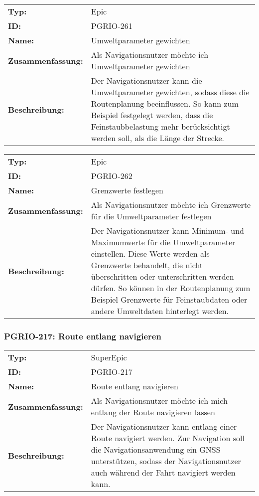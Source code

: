 		\begin{flushleft} 
\begin{tabular}{@{}lp{100mm}} 
\textbf{Typ:} & Epic \\ 
\textbf{ID:} & PGRIO-261 \\ 
\textbf{Name:} & Umweltparameter gewichten \\ 
\textbf{Zusammenfassung:} & Als Navigationsnutzer möchte ich Umweltparameter gewichten  \\ 
\textbf{Beschreibung:} & Der Navigationsnutzer kann die Umweltparameter gewichten, sodass diese die Routenplanung beeinflussen. So kann zum Beispiel festgelegt werden, dass die Feinstaubbelastung mehr berücksichtigt werden soll, als die Länge der Strecke. \\ 
\end{tabular} 
\end{flushleft} 

		\begin{flushleft} 
\begin{tabular}{@{}lp{100mm}} 
\textbf{Typ:} & Epic \\ 
\textbf{ID:} & PGRIO-262 \\ 
\textbf{Name:} & Grenzwerte festlegen \\ 
\textbf{Zusammenfassung:} & Als Navigationsnutzer möchte ich Grenzwerte für die Umweltparameter festlegen \\ 
\textbf{Beschreibung:} & Der Navigationsnutzer kann Minimum- und Maximumwerte für die Umweltparameter einstellen. Diese Werte werden als Grenzwerte behandelt, die nicht überschritten oder unterschritten werden dürfen. So können in der Routenplanung zum Beispiel Grenzwerte für Feinstaubdaten oder andere Umweltdaten hinterlegt werden. \\ 
\end{tabular} 
\end{flushleft} 

	\subsubsection{PGRIO-217: Route entlang navigieren} 
\begin{flushleft} 
\begin{tabular}{@{}lp{100mm}} 
\textbf{Typ:} & SuperEpic \\ 
\textbf{ID:} & PGRIO-217 \\ 
\textbf{Name:} & Route entlang navigieren \\ 
\textbf{Zusammenfassung:} & Als Navigationsnutzer möchte ich mich entlang der Route navigieren lassen \\ 
\textbf{Beschreibung:} & Der Navigationsnutzer kann entlang einer Route navigiert werden. Zur Navigation soll die Navigationsanwendung ein GNSS unterstützen, sodass der Navigationsnutzer auch während der Fahrt navigiert werden kann. \\ 
\end{tabular} 
\end{flushleft} 

